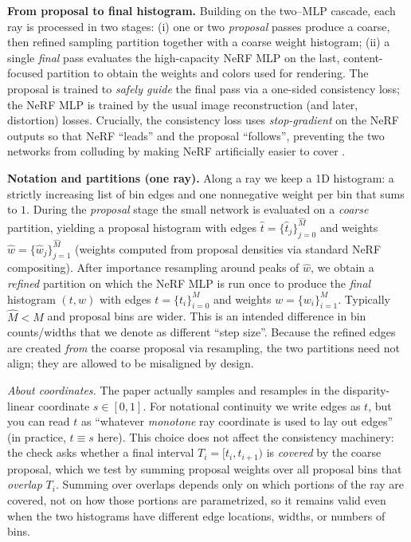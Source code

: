 \begin{enrichment}
\begin{enrichment}
        \newpage
        
        \textbf{From proposal to final histogram.} Building on the two–MLP cascade, each ray is processed in two stages: (i) one or two \emph{proposal} passes produce a coarse, then refined sampling partition together with a coarse weight histogram; (ii) a single \emph{final} pass evaluates the high-capacity NeRF MLP on the last, content-focused partition to obtain the weights and colors used for rendering. The proposal is trained to \emph{safely guide} the final pass via a one-sided consistency loss; the NeRF MLP is trained by the usual image reconstruction (and later, distortion) losses. Crucially, the consistency loss uses \emph{stop-gradient} on the NeRF outputs so that NeRF “leads” and the proposal “follows”, preventing the two networks from colluding by making NeRF artificially easier to cover \cite{barron2022_mipnerf360}.
        
        \textbf{Notation and partitions (one ray).} Along a ray we keep a 1D histogram: a strictly increasing list of bin edges and one nonnegative weight per bin that sums to $1$. During the \emph{proposal} stage the small network is evaluated on a \emph{coarse} partition, yielding a proposal histogram with edges $\hat{t}=\{\hat{t}_j\}_{j=0}^{\hat{M}}$ and weights $\hat{w}=\{\hat{w}_j\}_{j=1}^{\hat{M}}$ (weights computed from proposal densities via standard NeRF compositing). After importance resampling around peaks of $\hat{w}$, we obtain a \emph{refined} partition on which the NeRF MLP is run once to produce the \emph{final} histogram $(t,w)$ with edges $t=\{t_i\}_{i=0}^{M}$ and weights $w=\{w_i\}_{i=1}^{M}$. Typically $\hat{M}\!<\!M$ and proposal bins are wider. This is an intended difference in bin counts/widths that we denote as different “step size”. Because the refined edges are created \emph{from} the coarse proposal via resampling, the two partitions need not align; they are allowed to be misaligned by design.
        
        \textit{About coordinates.} The paper actually samples and resamples in the disparity-linear coordinate $s\!\in[0,1]$. For notational continuity we write edges as $t$, but you can read $t$ as “whatever \emph{monotone} ray coordinate is used to lay out edges” (in practice, $t\equiv s$ here). This choice does not affect the consistency machinery: the check asks whether a final interval $T_i=[t_i,t_{i+1})$ is \emph{covered} by the coarse proposal, which we test by summing proposal weights over all proposal bins that \emph{overlap} $T_i$. Summing over overlaps depends only on which portions of the ray are covered, not on how those portions are parametrized, so it remains valid even when the two histograms have different edge locations, widths, or numbers of bins.
        

\end{enrichment}
\end{enrichment}
